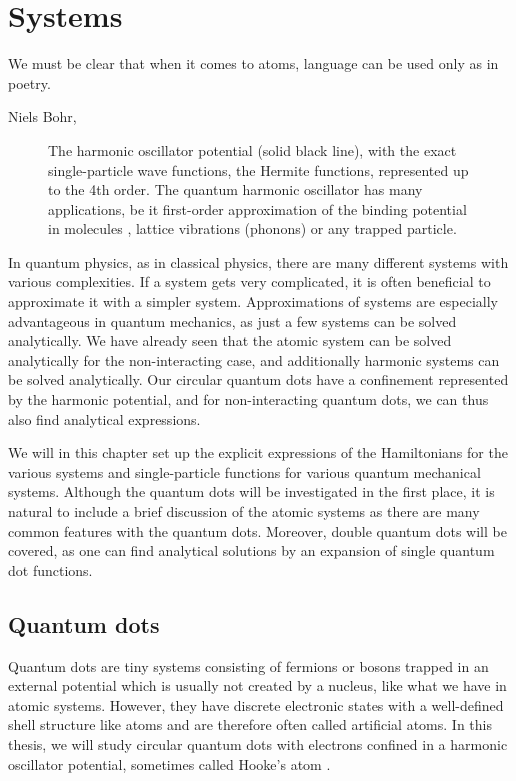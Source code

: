 \chapter{Systems} \label{chp:systems}
\epigraph{We must be clear that when it comes to atoms, language can be used only as in poetry.}{Niels Bohr, \supercite{heisenberg_physics_1971}}
\begin{figure}[H]
	\centering
	
	\caption{The harmonic oscillator potential (solid black line), with the exact single-particle wave functions, the Hermite functions, represented up to the 4th order. The quantum harmonic oscillator has many applications, be it first-order approximation of the binding potential in molecules \supercite{wilson_molecular_1955}, lattice vibrations (phonons) \supercite{cahill_heat_1989} or any trapped particle.}
	\label{fig:harmonicoscillator}
\end{figure}

In quantum physics, as in classical physics, there are many different systems with various complexities. If a system gets very complicated, it is often beneficial to approximate it with a simpler system. Approximations of systems are especially advantageous in quantum mechanics, as just a few systems can be solved analytically. We have already seen that the atomic system can be solved analytically for the non-interacting case, and additionally harmonic systems can be solved analytically. Our circular quantum dots have a confinement represented by the harmonic potential, and for non-interacting quantum dots, we can thus also find analytical expressions. 

We will in this chapter set up the explicit expressions of the Hamiltonians for the various systems and single-particle functions for various quantum mechanical systems. Although the quantum dots will be investigated in the first place, it is natural to include a brief discussion of the atomic systems as there are many common features with the quantum dots. Moreover, double quantum dots will be covered, as one can find analytical solutions by an expansion of single quantum dot functions.

\section{Quantum dots} \label{sec:quantumdots}
Quantum dots are tiny systems consisting of fermions or bosons trapped in an external potential which is usually not created by a nucleus, like what we have in atomic systems. However, they have discrete electronic states with a well-defined shell structure like atoms and are therefore often called artificial atoms. In this thesis, we will study circular quantum dots with electrons confined in a harmonic oscillator potential, sometimes called Hooke's atom \supercite{liang_hookes_2011}. 

